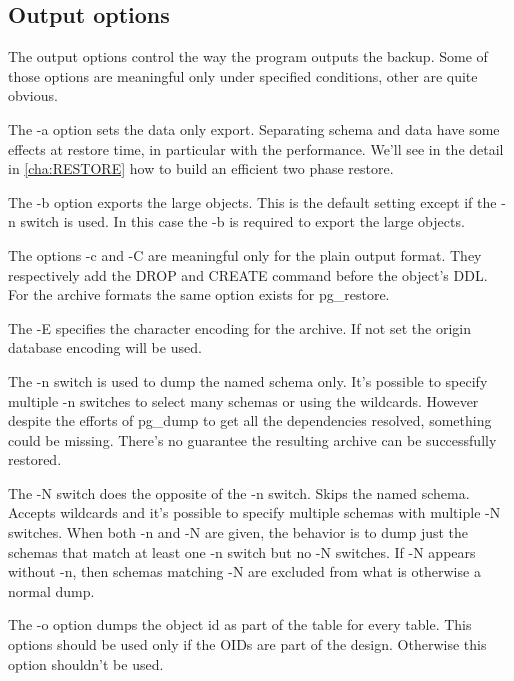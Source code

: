 \subsection{Output options}
\label{sub:PGDUMPOUTPUT}
The output options control the way the program outputs the backup. Some of those options are 
meaningful only under specified conditions, other are quite obvious.\newline

The -a option sets the data only export. Separating schema and data have some effects at restore 
time, in particular with the performance. We'll see in the detail in \ref{cha:RESTORE} how to 
build an efficient two phase restore.\newline

The -b option exports the large objects. This is the default setting except if the -n switch is 
used. In this case the -b is required to export the large objects.\newline

The options -c and -C are meaningful only for the plain output format. They respectively add the 
DROP and CREATE command before the object's DDL. For the archive formats the same option exists for 
pg\_restore.\newline

The -E specifies the character encoding for the archive. If not set the origin database encoding 
will be used.\newline 

The -n switch is used to dump the named schema only. It's possible to specify multiple -n switches 
to select many schemas or using the wildcards. However despite the efforts of pg\_dump to get all 
the dependencies resolved, something could be missing. There's no guarantee the resulting archive 
can be successfully restored.\newline

The -N switch does the opposite of the -n switch. Skips the named schema. Accepts wildcards and 
it's possible to specify multiple schemas with multiple -N switches. When both -n and -N are given, 
the behavior is to dump just the schemas that match at least one -n switch but no -N switches. If -N 
appears without -n, then schemas matching -N are excluded from what is otherwise a normal 
dump.\newline

The -o option dumps the object id as part of the table for every table. This options should be 
used only if the OIDs are part of the design. Otherwise this option shouldn't be used.\newline

